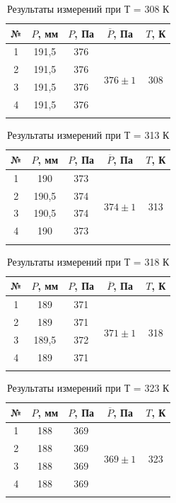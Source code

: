 \documentclass[a4paper, 12pt]{article}%
\begin{document}
\begin{enumerate}
\begin{longtable} {|c|c|c|c|c|}
	\hline
	№ & $ P $, мм &  $ P $, Па  & $ \overline P  $, Па  & $T$, К             \\ \hline
	1 & 191,5 & 376 & \multirow{5}{*}{$376 \pm 1$} &\multirow{5}{*}{308} \\ \cline{1-3}
	2 & 191,5  & 376 &                     &             \\ \cline{1-3}
	3 & 191,5 & 376 &                     &                      \\ \cline{1-3}
	4 & 191,5 & 376 &                     &                      \\ \hline
	\caption{Результаты измерений при Т = 308 К }
\end{longtable}

\begin{longtable} {|c|c|c|c|c|}
	\hline
	№ & $ P $, мм &  $ P $, Па  & $ \overline P  $, Па  & $T$, К             \\ \hline
	1 & 190 & 373 & \multirow{5}{*}{$374 \pm 1$} &\multirow{5}{*}{313} \\ \cline{1-3}
	2 & 190,5  & 374 &                     &             \\ \cline{1-3}
	3 & 190,5 & 374&                     &                      \\ \cline{1-3}
	4 & 190 & 373 &                     &                      \\ \hline
	\caption{Результаты измерений при Т = 313 К }
\end{longtable}

\begin{longtable} {|c|c|c|c|c|}
	\hline
	№ & $ P $, мм &  $ P $, Па  & $ \overline P  $, Па  & $T$, К             \\ \hline
	1 & 189 & 371 & \multirow{5}{*}{$371 \pm 1$} &\multirow{5}{*}{318} \\ \cline{1-3}
	2 & 189  & 371 &                     &             \\ \cline{1-3}
	3 & 189,5 & 372&                     &                      \\ \cline{1-3}
	4 & 189 & 371 &                     &                      \\ \hline
	\caption{Результаты измерений при Т = 318 К }
\end{longtable}

\newpage

\begin{longtable} {|c|c|c|c|c|}
	\hline
	№ & $ P $, мм &  $ P $, Па  & $ \overline P  $, Па  & $T$, К             \\ \hline
	1 & 188 & 369 & \multirow{5}{*}{$369 \pm 1$} &\multirow{5}{*}{323} \\ \cline{1-3}
	2 & 188  & 369 &                     &             \\ \cline{1-3}
	3 & 188 & 369 &                     &                      \\ \cline{1-3}
	4 & 188 & 369 &                     &                      \\ \hline
	\caption{Результаты измерений при Т = 323 К }
\end{longtable}
	

\end{enumerate}
\end{document}
